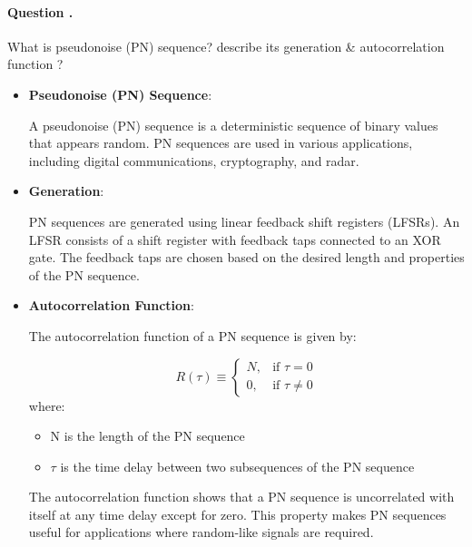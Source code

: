 \documentclass[14pt,a4paper]{report}
\newcounter{question}
\newcommand*\question{%
\stepcounter{question}%
\paragraph{Question \thesection.\thequestion}}
\begin{document}
\question
{
    What is pseudonoise (PN) sequence? describe its generation \& autocorrelation function ?
}
\begin{answer_box*}
    \begin{itemize}
        \item \textbf {Pseudonoise (PN) Sequence}:
    
        A pseudonoise (PN) sequence is a deterministic sequence of binary values that appears random. PN sequences are used in various applications, including digital communications, cryptography, and radar.
    
        \item \textbf {Generation}:
    
        PN sequences are generated using linear feedback shift registers (LFSRs). An LFSR consists of a shift register with feedback taps connected to an XOR gate. The feedback taps are chosen based on the desired length and properties of the PN sequence.
    
        \item \textbf {Autocorrelation Function}:
    
        The autocorrelation function of a PN sequence is given by:
    
        \begin{equation}
        R(\tau) \equiv 
        \begin{cases}
        N,     & \text{if } \tau=0 \\
        0,     & \text{if } \tau \neq 0
        \end{cases}
        \end{equation}
        where:

        \begin{itemize}
            \item  {N is the length of the PN sequence}
            \item  {$\tau$ is the time delay between two subsequences of the PN sequence}
        \end{itemize}
        The autocorrelation function shows that a PN sequence is uncorrelated with itself at any time delay except for zero. This property makes PN sequences useful for applications where random-like signals are required.
    
    \end{itemize}\end{answer_box*}
\end{document}
